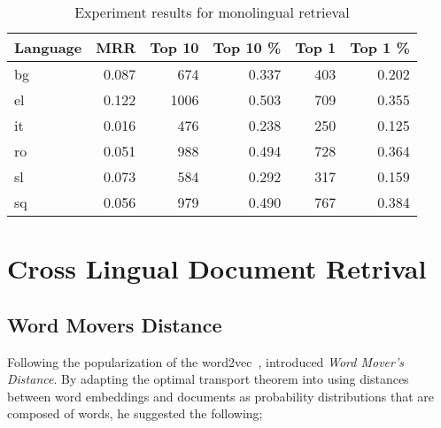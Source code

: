 \begin{table}[htbp]
    \centering
    \begin{tabular}{lrrrrr}
        \toprule%
        Language & MRR & Top 10 & Top 10 \% & Top 1 & Top 1 \% \\
        \midrule%
        bg & 0.087 & 674 & 0.337 & 403 & 0.202 \\
        el & 0.122 & 1006 & 0.503 & 709 & 0.355 \\
        it & 0.016 & 476 & 0.238 & 250 & 0.125 \\
        ro & 0.051 & 988 & 0.494 & 728 & 0.364 \\
        sl & 0.073 & 584 & 0.292 & 317 & 0.159 \\
        sq & 0.056 & 979 & 0.490 & 767 & 0.384 \\
        \bottomrule
    \end{tabular}
    \caption{Experiment results for monolingual retrieval}%
    \label{tab:monolingual_tfidf}
\end{table}


\section{Cross Lingual Document Retrival}%
\label{sec:cross_lingual_document_retrival}

\subsection{Word Movers Distance}%
\label{sub:word_movers_distance}

Following the popularization of the word2vec~\cite{mikolov_distributed_2013}, \textcite{kusner_word_2015} introduced \emph{Word Mover's Distance}.
By adapting the optimal transport theorem into using distances between word embeddings and documents as probability distributions that are composed of words, he suggested the following;

